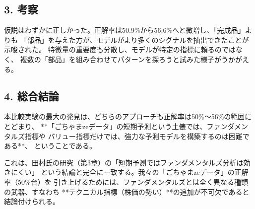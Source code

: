 \documentclass[a4paper, 11pt]{ltjsarticle}
\begin{document}
\subsection*{3. 考察}
仮説はわずかに正しかった。正解率は50.9\%から56.6\%へと微増し、「完成品」よりも
「部品」を与えた方が、モデルがより多くのシグナルを抽出できたことが示唆された。
特徴量の重要度も分散し、モデルが特定の指標に頼るのではなく、
複数の「部品」を組み合わせてパターンを探ろうと試みた様子がうかがえる。

\subsection*{4. 総合結論}
本比較実験の最大の発見は、どちらのアプローチも正解率は50\%～56\%の範囲にとどまり、
**「ごちゃまzeデータ」の短期予測という土俵では、ファンダメンタルズ指標や
バリュー指標だけでは、強力な予測モデルを構築するのは困難である**、
ということである。

これは、田村氏の研究（第3章）の「短期予測ではファンダメンタルズ分析は効きにくい」
という結論と完全に一致する。我々の「ごちゃまzeデータ」の正解率（50\%台）を
引き上げるためには、ファンダメンタルズとは全く異なる種類の武器、すなわち
**テクニカル指標（株価の勢い）**の追加が不可欠であると結論付けられる。
\end{document}
